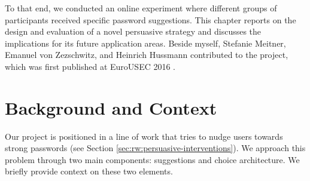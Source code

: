 To that end, we conducted an online experiment where different groups of participants received specific password suggestions. This chapter reports on the design and evaluation of a novel persuasive strategy and discusses the implications for its future application areas. Beside myself, Stefanie Meitner, Emanuel von Zezschwitz, and Heinrich Hussmann contributed to the project, which was first published at EuroUSEC 2016 \cite{Seitz2016DecoyEffect}.



\section{Background and Context}
Our project is positioned in a line of work that tries to nudge users towards strong passwords (see Section \ref{sec:rw:persuasive-interventions}). We approach this problem through two main components: suggestions and choice architecture. We briefly provide context on these two elements.  



